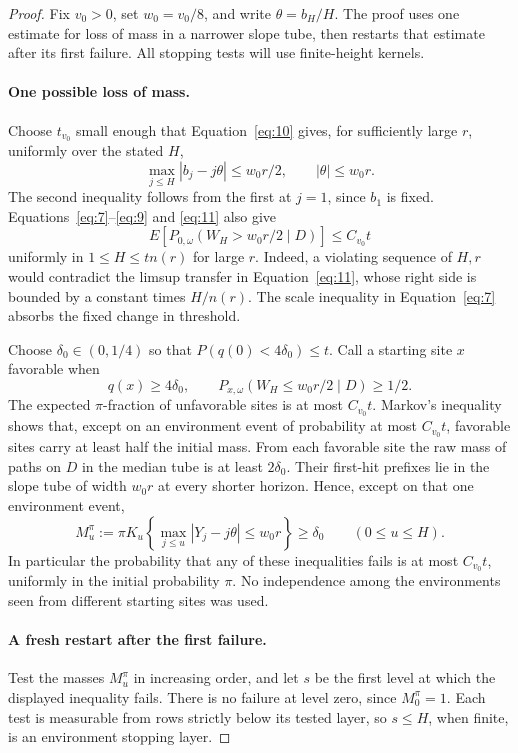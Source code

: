 \begin{proof}
Fix \(v_0>0\), set \(w_0=v_0/8\), and write
\(\theta=b_H/H\). The proof uses one estimate for loss of mass in a
narrower slope tube, then restarts that estimate after its first failure.
All stopping tests will use finite-height kernels.

\paragraph{One possible loss of mass.}
Choose \(t_{v_0}\) small enough that Equation~\eqref{eq:10} gives,
for sufficiently large \(r\), uniformly over the stated \(H\),
\[
\max_{j\le H}|b_j-j\theta|\le w_0r/2,
\qquad |\theta|\le w_0r.
\]
The second inequality follows from the first at \(j=1\), since
\(b_1\) is fixed. Equations~\eqref{eq:7}--\eqref{eq:9} and
\eqref{eq:11} also give
\[
E[P_{0,\omega}(W_H>w_0r/2\mid D)]\le C_{v_0}t
\]
uniformly in \(1\le H\le tn(r)\) for large \(r\). Indeed, a
violating sequence of \(H,r\) would contradict the limsup transfer
in Equation~\eqref{eq:11}, whose right side is bounded by a constant
times \(H/n(r)\). The scale inequality in Equation~\eqref{eq:7}
absorbs the fixed change in threshold.

Choose \(\delta_0\in(0,1/4)\) so that
\(P(q(0)<4\delta_0)\le t\). Call a starting site \(x\) favorable
when
\[
q(x)\ge4\delta_0,
\qquad P_{x,\omega}(W_H\le w_0r/2\mid D)\ge1/2.
\]
The expected \(\pi\)-fraction of unfavorable sites is at most
\(C_{v_0}t\). Markov's inequality shows that, except on an environment
event of probability at most \(C_{v_0}t\), favorable sites carry at
least half the initial mass. From each favorable site the raw mass of
paths on \(D\) in the median tube is at least \(2\delta_0\).
Their first-hit prefixes lie in the slope tube of width \(w_0r\) at
every shorter horizon. Hence, except on that one environment event,
\[
M_u^\pi:=
\pi K_u\left\{\max_{j\le u}|Y_j-j\theta|\le w_0r\right\}
\ge\delta_0
\qquad(0\le u\le H).
\]
In particular the probability that any of these inequalities fails is
at most \(C_{v_0}t\), uniformly in the initial probability \(\pi\).
No independence among the environments seen from different starting
sites was used.

\paragraph{A fresh restart after the first failure.}
Test the masses \(M_u^\pi\) in increasing order, and let \(s\) be
the first level at which the displayed inequality fails. There is no
failure at level zero, since \(M_0^\pi=1\). Each test is measurable
from rows strictly below its tested layer, so \(s\le H\), when finite,
is an environment stopping layer.


\end{proof}
